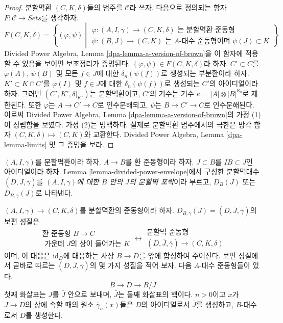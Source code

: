 \begin{proof}
분할멱환 $(C, K, \delta)$들의 범주를 $\mathcal{C}$라 쓰자.
다음으로 정의되는 함자 $F : \mathcal{C} \longrightarrow \textit{Sets}$를 생각하자.
$$
F(C, K, \delta) =
\left\{
(\varphi, \psi)
\middle|
\begin{matrix}
\varphi : (A, I, \gamma) \to (C, K, \delta)
\text{ 는 분할멱환 준동형} \\
\psi : (B, J) \to (C, K)\text{ 는 } 
A\text{-대수 준동형이며 }\psi(J) \subset K
\end{matrix}
\right\}
$$
Divided Power Algebra, Lemma \ref{dpa-lemma-a-version-of-brown}을
이 함자에 적용할 수 있음을 보이면 보조정리가 증명된다.
$(\varphi, \psi) \in F(C, K, \delta)$라 하자.
$C' \subset C$를 $\varphi(A)$, $\psi(B)$ 및 모든 $f \in J$에 대한
$\delta_n(\psi(f))$로 생성되는 부분환이라 하자.
$K' \subset K \cap C'$를 $\varphi(I)$ 및 $f \in J$에 대한
$\delta_n(\psi(f))$로 생성되는 $C'$의 아이디얼이라 하자.
그러면 $(C', K', \delta|_{K'})$는 분할멱환이고,
$C'$의 기수는 기수 $\kappa = |A| \otimes |B|^{\aleph_0}$로 제한된다.
또한 $\varphi$는 $A \to C' \to C$로 인수분해되고,
$\psi$는 $B \to C' \to C$로 인수분해된다. 이로써
Divided Power Algebra, Lemma \ref{dpa-lemma-a-version-of-brown}의
가정 (1)이 성립함을 보였다. 가정 (2)는 명백하다.
실제로 분할멱환 범주에서의 극한은 망각 함자
$(C, K, \delta) \mapsto (C, K)$와 교환한다. Divided Power Algebra,
Lemma \ref{dpa-lemma-limits} 및 그 증명을 보라.
\end{proof}

\begin{definition}
\label{definition-divided-power-envelope}
$(A, I, \gamma)$를 분할멱환이라 하자.
$A \to B$를 환 준동형이라 하자. $J \subset B$를 $IB \subset J$인
아이디얼이라 하자. Lemma \ref{lemma-divided-power-envelope}에서 구성한
분할멱대수 $(D, \bar J, \bar\gamma)$를
{\it $(A, I, \gamma)$에 대한 $B$ 안의 $J$의 분할멱 포락}이라 부르고,
$D_B(J)$ 또는 $D_{B, \gamma}(J)$로 나타낸다.
\end{definition}

\noindent
$(A, I, \gamma) \to (C, K, \delta)$를 분할멱환의 준동형이라 하자.
$D_{B, \gamma}(J) = (D, \bar J, \bar \gamma)$의 보편 성질은
$$
\begin{matrix}
\text{환 준동형 }B \to C \\
\text{ 가운데 }J\text{의 상이 들어가는 }K
\end{matrix}
\longleftrightarrow
\begin{matrix}
\text{분할멱 준동형} \\
(D, \bar J, \bar \gamma) \to (C, K, \delta)
\end{matrix}
$$
이며, 이 대응은 $\text{id}_D$에 대응하는 사상 $B \to D$를 앞에 합성하여
주어진다. 보편 성질에서 곧바로 따르는
$(D, \bar J, \bar \gamma)$의 몇 가지 성질을 적어 보자.
다음 $A$-대수 준동형들이 있다.
\begin{equation}
\label{equation-divided-power-envelope}
B \longrightarrow D \longrightarrow B/J
\end{equation}
첫째 화살표는 $J$를 $\bar J$ 안으로 보내며, $\bar J$는 둘째 화살표의
핵이다. $n > 0$이고 $x$가 $J \to D$의 상에 속할 때의 원소
$\bar\gamma_n(x)$들은 $D$의 아이디얼로서 $\bar J$를 생성하고,
$B$-대수로서 $D$를 생성한다.

